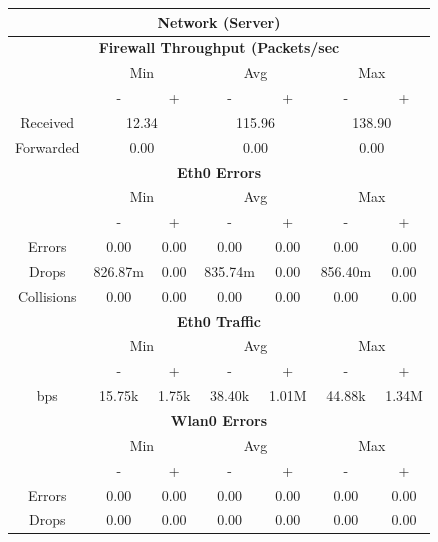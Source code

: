 \documentclass[11pt,a4paper,headinclude=false,footinclude=false]{scrreprt}
\begin{document}
\begin{table}[H]
\centering
    \begin{tabular}{||c|c|c|c|c|c|c||}
    \hline
    \multicolumn{7}{|c|}{\textbf{Network (Server)}} \\
    \hline
    \multicolumn{7}{|c|}{\textbf{Firewall Throughput (Packets/sec}} \\
    \hline\hline
      & \multicolumn{2}{|c|}{Min} & \multicolumn{2}{|c|}{Avg} & \multicolumn{2}{|c|}{Max} \\
    \hline
      & - & + & - & + & - & + \\
    \hline
    Received & \multicolumn{2}{|c|}{12.34} & \multicolumn{2}{|c|}{115.96} & \multicolumn{2}{|c|}{138.90} \\
    \hline
    Forwarded & \multicolumn{2}{|c|}{0.00} & \multicolumn{2}{|c|}{0.00} & \multicolumn{2}{|c|}{0.00} \\
    \hline\hline
    \multicolumn{7}{|c|}{\textbf{Eth0 Errors}} \\
    \hline\hline
      & \multicolumn{2}{|c|}{Min} & \multicolumn{2}{|c|}{Avg} & \multicolumn{2}{|c|}{Max} \\
    \hline
     & - & + & - & + & - & + \\
    \hline
    Errors & 0.00 & 0.00 & 0.00 & 0.00 & 0.00 & 0.00 \\
    \hline
    Drops & 826.87m & 0.00 & 835.74m & 0.00 & 856.40m & 0.00 \\
    \hline
    Collisions & 0.00 & 0.00 & 0.00 & 0.00 & 0.00 & 0.00 \\
    \hline\hline
    \multicolumn{7}{|c|}{\textbf{Eth0 Traffic}} \\
    \hline\hline
      & \multicolumn{2}{|c|}{Min} & \multicolumn{2}{|c|}{Avg} & \multicolumn{2}{|c|}{Max} \\
    \hline
      & - & + & - & + & - & + \\
    \hline
    bps & 15.75k & 1.75k & 38.40k & 1.01M & 44.88k & 1.34M \\
    \hline\hline
    \multicolumn{7}{|c|}{\textbf{Wlan0 Errors}} \\
    \hline\hline
      & \multicolumn{2}{|c|}{Min} & \multicolumn{2}{|c|}{Avg} & \multicolumn{2}{|c|}{Max} \\
    \hline
      & - & + & - & + & - & + \\
    \hline
    Errors  & 0.00 & 0.00 & 0.00 & 0.00 & 0.00 & 0.00 \\
    \hline
    Drops & 0.00 & 0.00 & 0.00 & 0.00 & 0.00 & 0.00 \\

\end{tabular}
\end{table}
\end{document}
